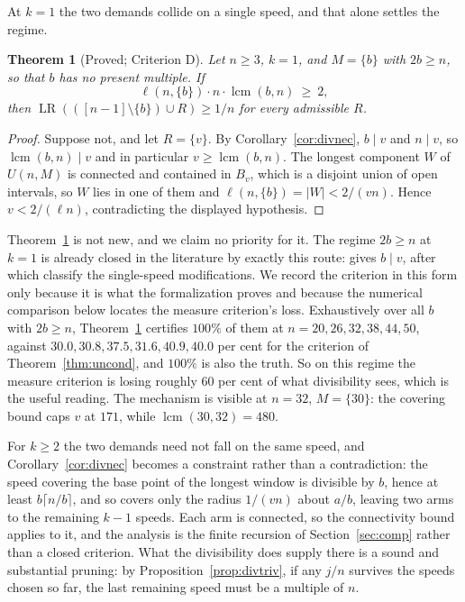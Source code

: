 \documentclass[11pt]{amsart}
\theoremstyle{plain}
\newtheorem{theorem}{Theorem}[section]
\theoremstyle{definition}
\newcommand{\LR}{\operatorname{LR}}
\begin{document}
At $k=1$ the two demands collide on a single speed, and that alone settles the regime.

\begin{theorem}[Proved; Criterion D]\label{thm:critD}
Let $n\ge3$, $k=1$, and $M=\{b\}$ with $2b\ge n$, so that $b$ has no present multiple. If
\[
  \ell(n,\{b\})\cdot n\cdot\operatorname{lcm}(b,n)\ \ge\ 2,
\]
then $\LR(([n-1]\setminus\{b\})\cup R)\ge1/n$ for every admissible $R$.
\end{theorem}

\begin{proof}
Suppose not, and let $R=\{v\}$. By Corollary~\ref{cor:divnec}, $b\mid v$ and $n\mid v$, so
$\operatorname{lcm}(b,n)\mid v$ and in particular $v\ge\operatorname{lcm}(b,n)$. The longest
component $W$ of $U(n,M)$ is connected and contained in $B_v$, which is a disjoint union of open
intervals, so $W$ lies in one of them and $\ell(n,\{b\})=|W|<2/(vn)$. Hence
$v<2/(\ell n)$, contradicting the displayed hypothesis.
\end{proof}

Theorem~\ref{thm:critD} is not new, and we claim no priority for it. The regime $2b\ge n$ at
$k=1$ is already closed in the literature by exactly this route: \cite[Lemma~2.3]{zhang} gives
$b\mid v$, after which \cite[Thms.~1.1, 1.2]{zhang} classify the single-speed modifications. We record the criterion in this form only because it
is what the formalization proves and because the numerical comparison below locates the measure
criterion's loss. Exhaustively over all $b$ with $2b\ge n$, Theorem~\ref{thm:critD} certifies
$100\%$ of them at $n=20,26,32,38,44,50$, against $30.0,30.8,37.5,31.6,40.9,40.0$ per cent for the
criterion of Theorem~\ref{thm:uncond}, and $100\%$ is also the truth. So on this regime the measure
criterion is losing roughly $60$ per cent of what divisibility sees, which is the useful reading.
The mechanism is visible at $n=32$, $M=\{30\}$: the covering bound caps $v$ at $171$, while
$\operatorname{lcm}(30,32)=480$.

For $k\ge2$ the two demands need not fall on the same speed, and Corollary~\ref{cor:divnec} becomes
a constraint rather than a contradiction: the speed covering the base point of the longest window is
divisible by $b$, hence at least $b\lceil n/b\rceil$, and so covers only the radius $1/(vn)$ about
$a/b$, leaving two arms to the remaining $k-1$ speeds. Each arm is connected, so the connectivity
bound applies to it, and the analysis is the finite recursion of Section~\ref{sec:comp} rather than
a closed criterion. What the divisibility does supply there is a sound and substantial pruning: by
Proposition~\ref{prop:divtriv}, if any $j/n$ survives the speeds chosen so far, the last remaining
speed must be a multiple of $n$.
\end{document}
